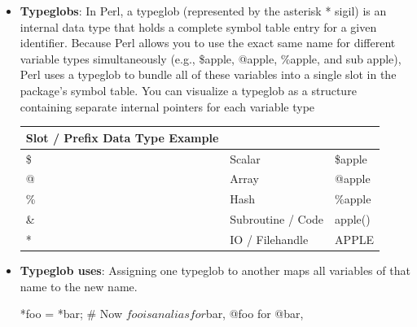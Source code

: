 \documentclass{report}
\begin{document}
\begin{itemize}
\begin{perlcode}
            $$y = 25; # $$ Dereferences
            \end{perlcode}
            \begin{itemize}
                \item \textbackslash \$scalar
                \item \textbackslash @array
                \item \textbackslash \%hash
                \item \textbackslash \&function
            \end{itemize}
        \item \textbf{Typeglobs}: In Perl, a typeglob (represented by the asterisk * sigil) is an internal data type that holds a complete symbol table entry for a given identifier.
            \bigbreak \noindent 
            Because Perl allows you to use the exact same name for different variable types simultaneously (e.g., \$apple, @apple, \%apple, and sub apple), Perl uses a typeglob to bundle all of these variables into a single slot in the package's symbol table. You can visualize a typeglob as a structure containing separate internal pointers for each variable type
            \begin{center}
                \begin{tabularx}{\textwidth}{@{}lXX@{}}
                    \toprule
                    \textbf{Slot / Prefix} \textbf{Data Type} \textbf{Example} \\
                    \midrule
                    \$ &Scalar &\$apple\\[2ex]
                    @ &Array &@apple\\[2ex]
                    \% &Hash &\%apple\\[2ex]
                    \& &Subroutine / Code &apple()\\[2ex]
                    * &IO / Filehandle &APPLE \\
                    \bottomrule
                \end{tabularx}
            \end{center}
        \item \textbf{Typeglob uses}: Assigning one typeglob to another maps all variables of that name to the new name.
            \bigbreak \noindent 
            \begin{perlcode}
                *foo = *bar;
                # Now $foo is an alias for $bar, @foo for @bar, %
            \end{perlcode}

\end{itemize}
\end{document}
